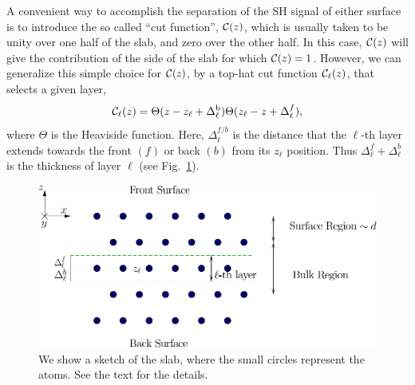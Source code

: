 \documentclass[floatfix,prb,aps,superscriptaddress,11pt,preprint]{revtex4}
\begin{document}
A convenient way to accomplish the separation of the SH signal of
either surface is to introduce
the so called
``cut function'', ${\mathbf{\cal C}}(z)$, which is usually taken to be unity over one half
of the slab, and zero over the other half.
In this case, ${\mathbf{\cal C}}(z)$ will give the contribution of the side of the
slab for which ${\mathbf{\cal C}}(z)=1$. However, we can generalize this simple choice
for ${\mathbf{\cal C}}(z)$, 
by a top-hat cut function
${\mathbf{\cal C}}_\ell(z)$, that selects a given layer,
\begin{equation}
\label{sz}
{\mathbf{\cal C}}_\ell(z)=\Theta(z-z_\ell+\Delta_\ell^{\mathrm{b}})
            \Theta(z_\ell-z+\Delta_\ell^f),
\end{equation}
where $\Theta$ is the Heaviside function. Here, $\Delta_\ell^{f/b}$
is the distance that the $\ell$-th layer extends towards the front
$(f)$ or back $(b)$ from its $z_\ell$ position.  Thus
$\Delta_\ell^f+\Delta_\ell^b$ is the thickness of layer $\ell$
(see Fig.~\ref{fslab}).
\begin{figure}[b]
\centering
\includegraphics[scale=.7]{images/slab}
\caption{
We show a sketch of the slab, where the small
circles represent the atoms. See the text for the details.
}
\label{fslab}
\end{figure}
\end{document}
